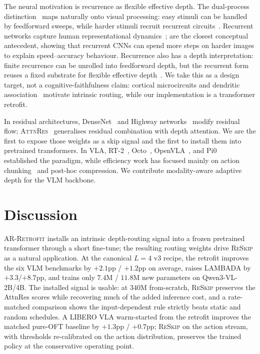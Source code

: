 \documentclass{article}
\newcommand{\attnres}{\textsc{AttnRes}}
\newcommand{\reskip}{\textsc{ReSkip}}
\newcommand{\retrofit}{\textsc{AR-Retrofit}}
\begin{document}
The neural motivation is recurrence as flexible effective depth. The dual-process distinction~\citep{kahneman2011thinking} maps naturally onto visual processing: easy stimuli can be handled by feedforward sweeps, while harder stimuli recruit recurrent circuits~\citep{lamme2000distinct, kar2019recurrent, dicarlo2012does}. Recurrent networks capture human representational dynamics~\citep{kietzmann2019recurrence}; \citet{spoerer2020recurrent} are the closest conceptual antecedent, showing that recurrent CNNs can spend more steps on harder images to explain speed--accuracy behaviour. Recurrence also has a depth interpretation: finite recurrence can be unrolled into feedforward depth, but the recurrent form reuses a fixed substrate for flexible effective depth~\citep{vanbergen2020going}. We take this as a design target, not a cognitive-faithfulness claim: cortical microcircuits and dendritic association~\citep{bastos2012canonical, buschman2007topdown, larkum2013cellular} motivate intrinsic routing, while our implementation is a transformer retrofit.

In residual architectures, DenseNet~\citep{huang2017densely} and Highway networks~\citep{srivastava2015highway} modify residual flow; \attnres{}~\citep{chen2026attnres} generalises residual combination with depth attention. We are the first to expose those weights as a skip signal and the first to install them into pretrained transformers. In VLA, RT-2~\citep{brohan2023rt}, Octo~\citep{team2024octo}, OpenVLA~\citep{kim2024openvla}, and Pi0~\citep{black2024pi0} established the paradigm, while efficiency work has focused mainly on action chunking~\citep{zhao2023learning} and post-hoc compression. We contribute modality-aware adaptive depth for the VLM backbone.

\section{Discussion}
\label{sec:discussion}

\retrofit{} installs an intrinsic depth-routing signal into a frozen pretrained transformer through a short fine-tune; the resulting routing weights drive \reskip{} as a natural application. At the canonical $L{=}4$ v3 recipe, the retrofit improves the six VLM benchmarks by $+2.1$pp / $+1.2$pp on average, raises LAMBADA by $+3.3$/$+8.7$pp, and trains only $7.4$M / $11.8$M new parameters on Qwen3-VL-2B/4B. The installed signal is usable: at $340$M from-scratch, \reskip{} preserves the AttnRes scores while recovering much of the added inference cost, and a rate-matched comparison shows the input-dependent rule strictly beats static and random schedules. A LIBERO VLA warm-started from the retrofit improves the matched pure-OFT baseline by $+1.3$pp / $+0.7$pp; \reskip{} on the action stream, with thresholds re-calibrated on the action distribution, preserves the trained policy at the conservative operating point.
\end{document}
